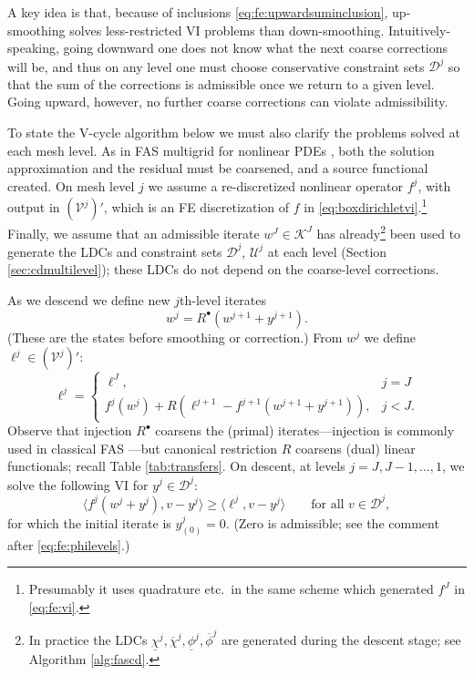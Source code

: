 \documentclass[letterpaper,final,12pt,reqno]{amsart}
\theoremstyle{cstyle}
\theoremstyle{cstyle*}
\theoremstyle{dstyle}
\numberwithin{equation}{section}
\numberwithin{figure}{section}
\numberwithin{table}{section}
\numberwithin{theorem}{section}
\newcommand{\cV}{\mathcal{V}}
\newcommand{\ip}[2]{\langle#1,#2\rangle}
\newcommand{\iR}{R^{\bullet}}
\begin{document}
A key idea is that, because of inclusions \eqref{eq:fe:upwardsuminclusion}, up-smoothing solves less-restricted VI problems than down-smoothing.  Intuitively-speaking, going downward one does not know what the next coarse corrections will be, and thus on any level one must choose conservative constraint sets $\mathcal{D}^j$ so that the sum of the corrections is admissible once we return to a given level.  Going upward, however, no further coarse corrections can violate admissibility.

To state the V-cycle algorithm below we must also clarify the problems solved at each mesh level.  As in FAS multigrid for nonlinear PDEs \cite{BrandtLivne2011,Bruneetal2015,Trottenbergetal2001}, both the solution approximation and the residual must be coarsened, and a source functional created.  On mesh level $j$ we assume a re-discretized nonlinear operator $f^j$, with output in $(\cV^j)'$, which is an FE discretization of $f$ in \eqref{eq:boxdirichletvi}.\footnote{Presumably it uses quadrature etc.~in the same scheme which generated $f^J$ in \eqref{eq:fe:vi}.}  Finally, we assume that an admissible iterate $w^J \in \mathcal{K}^J$ has already\footnote{In practice the LDCs $\underline{\chi}^j,\overline{\chi}^j,\underline{\phi}^j,\overline{\phi}^j$ are generated during the descent stage; see Algorithm \ref{alg:fascd}.} been used to generate the LDCs and constraint sets $\mathcal{D}^j$, $\mathcal{U}^j$ at each level (Section \ref{sec:cdmultilevel}); these LDCs do not depend on the coarse-level corrections.

As we descend we define new $j$th-level iterates
\begin{equation}
w^j = \iR(w^{j+1} + y^{j+1}).  \label{eq:fe:definew}
\end{equation}
(These are the states before smoothing or correction.)  From $w^j$ we define $\ell^j \in (\cV^j)'$:
\begin{equation}
\ell^j = \begin{cases} \ell^J, & j=J \\
                       f^j(w^j) + R\left(\ell^{j+1}-f^{j+1}(w^{j+1}+y^{j+1})\right), & j<J. \end{cases} \label{eq:fe:levelsource}
\end{equation}
Observe that injection $\iR$ coarsens the (primal) iterates---injection is commonly used in classical FAS \cite[section 5.3]{Trottenbergetal2001}---but canonical restriction $R$ coarsens (dual) linear functionals; recall Table \ref{tab:transfers}.  On descent, at levels $j=J,J-1,\dots,1$, we solve the following VI for $y^j \in \mathcal{D}^j$:
\begin{equation}
\ip{f^j(w^j + y^j)}{v-y^j} \ge \ip{\ell^j}{v-y^j} \qquad \text{for all } v\in \mathcal{D}^j, \label{eq:fe:downvi}
\end{equation}
for which the initial iterate is $y_{(0)}^j=0$.  (Zero is admissible; see the comment after \eqref{eq:fe:philevels}.)
\end{document}
